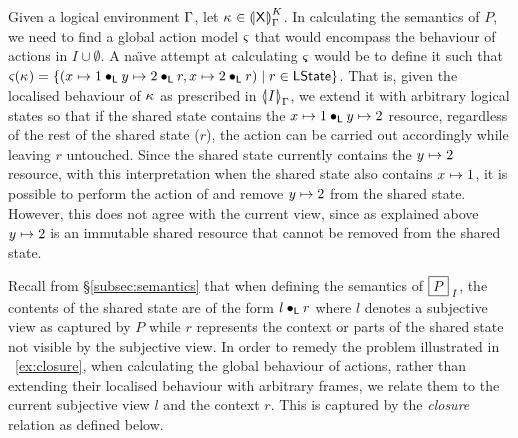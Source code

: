 \begin{example}[]
Given a logical environment $\lenv$, let $\ca{} \in \semK[\lenv]{\token{X}}$. In calculating the semantics of $P$, we need to find a global action model $\amod{}$ that would encompass the behaviour of actions in $I \cup \emptyset$. A na\"\i ve attempt at calculating $\amod{}$ would be to define it such that $\amod{}(\ca{}) = \left\{(\cell{x}{1} \composeL \cell{y}{2} \composeL r, \cell{x}{2} \composeL r ) \mid r \in \LStates \right\}$. That is, given the localised behaviour of $\ca{}$ as prescribed in $\semI[\lenv]{I}$, we extend it with arbitrary logical states so that if the shared state contains the $\cell{x}{1} \composeL \cell{y}{2}$ resource, regardless of the rest of the shared state ($r$), the action can be carried out accordingly while leaving $r$ untouched. Since the shared state currently contains the $\cell{y}{2}$ resource, with this interpretation when the shared state also contains $\cell{x}{1}$, it is possible to perform the action of  and remove $\cell{y}{2}$ from the shared state. However, this does not agree with the current view, since as explained above $\cell{y}{2}$ is an immutable shared resource that cannot be removed from the shared state. 
%
\end{example}
%
%
Recall from \S\ref{subsec:semantics} that when defining the semantics of $\shared{P}{I}$, the contents of the shared state are of the form $l \composeL r$ where $l$ denotes a subjective view as captured by $P$ while $r$ represents the context or parts of the shared state not visible by the subjective view. In order to remedy the problem illustrated in \ex~\ref{ex:closure}, when calculating the global behaviour of actions, rather than extending their localised behaviour with arbitrary frames, we relate them to the current subjective view $l$ and the context $r$. This is captured by the \emph{closure} relation as defined below.
